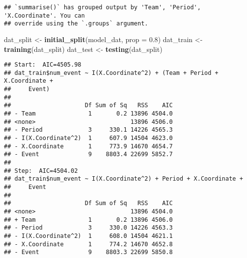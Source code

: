 \documentclass[
  a3paper,
]{article}
\newenvironment{Shaded}{\begin{snugshade}}{\end{snugshade}}
\newcommand{\AttributeTok}[1]{\textcolor[rgb]{0.13,0.29,0.53}{#1}}
\newcommand{\CommentTok}[1]{\textcolor[rgb]{0.56,0.35,0.01}{\textit{#1}}}
\newcommand{\DecValTok}[1]{\textcolor[rgb]{0.00,0.00,0.81}{#1}}
\newcommand{\FloatTok}[1]{\textcolor[rgb]{0.00,0.00,0.81}{#1}}
\newcommand{\FunctionTok}[1]{\textcolor[rgb]{0.13,0.29,0.53}{\textbf{#1}}}
\newcommand{\NormalTok}[1]{#1}
\newcommand{\OtherTok}[1]{\textcolor[rgb]{0.56,0.35,0.01}{#1}}
\newcommand{\SpecialCharTok}[1]{\textcolor[rgb]{0.81,0.36,0.00}{\textbf{#1}}}
\newcommand{\StringTok}[1]{\textcolor[rgb]{0.31,0.60,0.02}{#1}}
\begin{document}
\begin{verbatim}
## `summarise()` has grouped output by 'Team', 'Period', 'X.Coordinate'. You can
## override using the `.groups` argument.
\end{verbatim}

\begin{Shaded}
\begin{Highlighting}[]
\NormalTok{dat\_split }\OtherTok{\textless{}{-}} \FunctionTok{initial\_split}\NormalTok{(model\_dat, }\AttributeTok{prop =} \FloatTok{0.8}\NormalTok{)}
\NormalTok{dat\_train }\OtherTok{\textless{}{-}} \FunctionTok{training}\NormalTok{(dat\_split)}
\NormalTok{dat\_test }\OtherTok{\textless{}{-}} \FunctionTok{testing}\NormalTok{(dat\_split) }
\end{Highlighting}
\end{Shaded}

\begin{Shaded}
\end{Shaded}

\begin{verbatim}
## Start:  AIC=4505.98
## dat_train$num_event ~ I(X.Coordinate^2) + (Team + Period + X.Coordinate + 
##     Event)
## 
##                     Df Sum of Sq   RSS    AIC
## - Team               1       0.2 13896 4504.0
## <none>                           13896 4506.0
## - Period             3     330.1 14226 4565.3
## - I(X.Coordinate^2)  1     607.9 14504 4623.0
## - X.Coordinate       1     773.9 14670 4654.7
## - Event              9    8803.4 22699 5852.7
## 
## Step:  AIC=4504.02
## dat_train$num_event ~ I(X.Coordinate^2) + Period + X.Coordinate + 
##     Event
## 
##                     Df Sum of Sq   RSS    AIC
## <none>                           13896 4504.0
## + Team               1       0.2 13896 4506.0
## - Period             3     330.0 14226 4563.3
## - I(X.Coordinate^2)  1     608.0 14504 4621.1
## - X.Coordinate       1     774.2 14670 4652.8
## - Event              9    8803.3 22699 5850.8
\end{verbatim}
\end{document}
